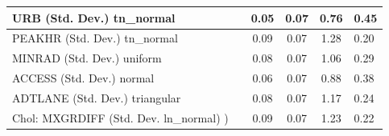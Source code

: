 \begin{table}
\begin{center}
\begin{tabular}{|l|l|c|c|c|l|}
			\hline
			URB (Std. Dev.) tn_normal &  & 0.05 & 0.07 & 0.76 & 0.45 \\
			\hline
			PEAKHR (Std. Dev.) tn_normal &  & 0.09 & 0.07 & 1.28 & 0.20 \\
			\hline
			MINRAD (Std. Dev.) uniform &  & 0.08 & 0.07 & 1.06 & 0.29 \\
			\hline
			ACCESS (Std. Dev.) normal &  & 0.06 & 0.07 & 0.88 & 0.38 \\
			\hline
			ADTLANE (Std. Dev.) triangular &  & 0.08 & 0.07 & 1.17 & 0.24 \\
			\hline
			 Chol: MXGRDIFF (Std. Dev. ln_normal) ) &  & 0.09 & 0.07 & 1.23 & 0.22 \\
			\hline
		\end{tabular}
	\end{center}
\end{table}